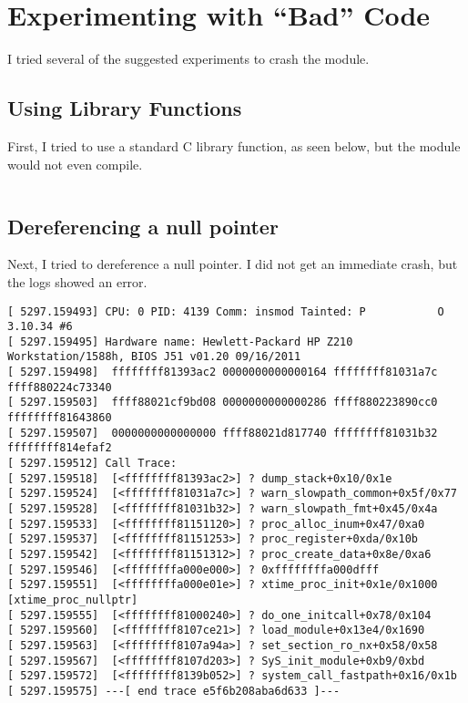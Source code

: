 \documentclass[11pt]{article}
\begin{document}
\section{Experimenting with ``Bad'' Code}
\label{sec:exper-with-bad}
I tried several of the suggested experiments to crash the module.

\subsection{Using Library Functions}
\label{sec:using-libr-funct}

First, I tried to use a standard C library function, as seen below, but the module would not even compile.
\inputminted{c}{/home/zach/irene/docs/latex-repo/CS_550/prog2/module/errors/xtime_proc-libfunction.c}

\subsection{Dereferencing a null pointer}
\label{sec:deref-null-point}

Next, I tried to dereference a null pointer.  I did not get an immediate crash, but the logs showed an error.
\begin{verbatim}
[ 5297.159493] CPU: 0 PID: 4139 Comm: insmod Tainted: P           O 3.10.34 #6
[ 5297.159495] Hardware name: Hewlett-Packard HP Z210 Workstation/1588h, BIOS J51 v01.20 09/16/2011
[ 5297.159498]  ffffffff81393ac2 0000000000000164 ffffffff81031a7c ffff880224c73340
[ 5297.159503]  ffff88021cf9bd08 0000000000000286 ffff880223890cc0 ffffffff81643860
[ 5297.159507]  0000000000000000 ffff88021d817740 ffffffff81031b32 ffffffff814efaf2
[ 5297.159512] Call Trace:
[ 5297.159518]  [<ffffffff81393ac2>] ? dump_stack+0x10/0x1e
[ 5297.159524]  [<ffffffff81031a7c>] ? warn_slowpath_common+0x5f/0x77
[ 5297.159528]  [<ffffffff81031b32>] ? warn_slowpath_fmt+0x45/0x4a
[ 5297.159533]  [<ffffffff81151120>] ? proc_alloc_inum+0x47/0xa0
[ 5297.159537]  [<ffffffff81151253>] ? proc_register+0xda/0x10b
[ 5297.159542]  [<ffffffff81151312>] ? proc_create_data+0x8e/0xa6
[ 5297.159546]  [<ffffffffa000e000>] ? 0xffffffffa000dfff
[ 5297.159551]  [<ffffffffa000e01e>] ? xtime_proc_init+0x1e/0x1000 [xtime_proc_nullptr]
[ 5297.159555]  [<ffffffff81000240>] ? do_one_initcall+0x78/0x104
[ 5297.159560]  [<ffffffff8107ce21>] ? load_module+0x13e4/0x1690
[ 5297.159563]  [<ffffffff8107a94a>] ? set_section_ro_nx+0x58/0x58
[ 5297.159567]  [<ffffffff8107d203>] ? SyS_init_module+0xb9/0xbd
[ 5297.159572]  [<ffffffff8139b052>] ? system_call_fastpath+0x16/0x1b
[ 5297.159575] ---[ end trace e5f6b208aba6d633 ]---
\end{verbatim}
\end{document}
